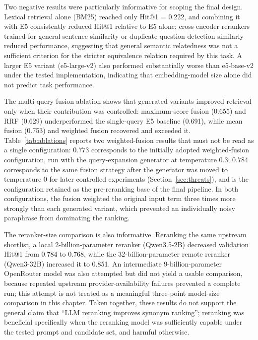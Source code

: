 Two negative results were particularly informative for scoping the final design. Lexical retrieval alone (BM25) reached only Hit@1 = 0.222, and combining it with E5 consistently reduced Hit@1 relative to E5 alone; cross-encoder rerankers trained for general sentence similarity or duplicate-question detection similarly reduced performance, suggesting that general semantic relatedness was not a sufficient criterion for the stricter equivalence relation required by this task. A larger E5 variant (e5-large-v2) also performed substantially worse than e5-base-v2 under the tested implementation, indicating that embedding-model size alone did not predict task performance.

The multi-query fusion ablation shows that generated variants improved retrieval only when their contribution was controlled: maximum-score fusion (0.655) and RRF (0.629) underperformed the single-query E5 baseline (0.691), while mean fusion (0.753) and weighted fusion recovered and exceeded it. Table~\ref{tab:ablations} reports two weighted-fusion results that must not be read as a single configuration: 0.773 corresponds to the initially adopted weighted-fusion configuration, run with the query-expansion generator at temperature 0.3; 0.784 corresponds to the same fusion strategy after the generator was moved to temperature 0 for later controlled experiments (Section~\ref{sec:threats}), and is the configuration retained as the pre-reranking base of the final pipeline. In both configurations, the fusion weighted the original input term three times more strongly than each generated variant, which prevented an individually noisy paraphrase from dominating the ranking.

The reranker-size comparison is also informative. Reranking the same upstream shortlist, a local 2-billion-parameter reranker (Qwen3.5-2B) decreased validation Hit@1 from 0.784 to 0.768, while the 32-billion-parameter remote reranker (Qwen3-32B) increased it to 0.851. An intermediate 9-billion-parameter OpenRouter model was also attempted but did not yield a usable comparison, because repeated upstream provider-availability failures prevented a complete run; this attempt is not treated as a meaningful three-point model-size comparison in this chapter. Taken together, these results do not support the general claim that ``LLM reranking improves synonym ranking''; reranking was beneficial specifically when the reranking model was sufficiently capable under the tested prompt and candidate set, and harmful otherwise.

